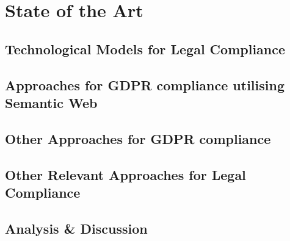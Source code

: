 \chapter{State of the Art}\label{chapter:sota}

\section{Technological Models for Legal Compliance}\label{sec:sota:models}

\section{Approaches for GDPR compliance utilising Semantic Web}\label{sec:sota:gdpr-semweb}

\section{Other Approaches for GDPR compliance}\label{sec:sota:gdpr-other}

\section{Other Relevant Approaches for Legal Compliance}\label{sec:sota:other}

\section{Analysis \& Discussion}\label{sec:sota:analysis}